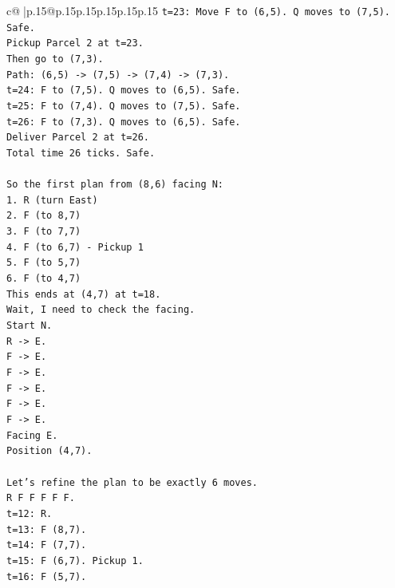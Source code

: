 \documentclass{article}
\begin{document}
{\begin{supertabular}{c@{$\;$}|p{.15\linewidth}@{}p{.15\linewidth}p{.15\linewidth}p{.15\linewidth}p{.15\linewidth}p{.15\linewidth}}
{{{\texttt{t=23: Move F to (6,5). Q moves to (7,5). Safe.} \\
\texttt{Pickup Parcel 2 at t=23.} \\
\texttt{Then go to (7,3).} \\
\texttt{Path: (6,5) {-}> (7,5) {-}> (7,4) {-}> (7,3).} \\
\texttt{t=24: F to (7,5). Q moves to (6,5). Safe.} \\
\texttt{t=25: F to (7,4). Q moves to (7,5). Safe.} \\
\texttt{t=26: F to (7,3). Q moves to (6,5). Safe.} \\
\texttt{Deliver Parcel 2 at t=26.} \\
\texttt{Total time 26 ticks. Safe.} \\
\\ 
\texttt{So the first plan from (8,6) facing N:} \\
\texttt{1. R (turn East)} \\
\texttt{2. F (to 8,7)} \\
\texttt{3. F (to 7,7)} \\
\texttt{4. F (to 6,7) {-} Pickup 1} \\
\texttt{5. F (to 5,7)} \\
\texttt{6. F (to 4,7)} \\
\texttt{This ends at (4,7) at t=18.} \\
\texttt{Wait, I need to check the facing.} \\
\texttt{Start N.} \\
\texttt{R {-}> E.} \\
\texttt{F {-}> E.} \\
\texttt{F {-}> E.} \\
\texttt{F {-}> E.} \\
\texttt{F {-}> E.} \\
\texttt{F {-}> E.} \\
\texttt{Facing E.} \\
\texttt{Position (4,7).} \\
\\ 
\texttt{Let's refine the plan to be exactly 6 moves.} \\
\texttt{R F F F F F.} \\
\texttt{t=12: R.} \\
\texttt{t=13: F (8,7).} \\
\texttt{t=14: F (7,7).} \\
\texttt{t=15: F (6,7). Pickup 1.} \\
\texttt{t=16: F (5,7).} \\
}}}
\end{supertabular}}
\end{document}

